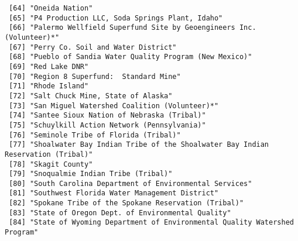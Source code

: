 \documentclass[
  12pt,
]{article}
\begin{document}
\begin{verbatim}
 [64] "Oneida Nation"                                                                                                        
 [65] "P4 Production LLC, Soda Springs Plant, Idaho"                                                                         
 [66] "Palermo Wellfield Superfund Site by Geoengineers Inc. (Volunteer)*"                                                   
 [67] "Perry Co. Soil and Water District"                                                                                    
 [68] "Pueblo of Sandia Water Quality Program (New Mexico)"                                                                  
 [69] "Red Lake DNR"                                                                                                         
 [70] "Region 8 Superfund:  Standard Mine"                                                                                   
 [71] "Rhode Island"                                                                                                         
 [72] "Salt Chuck Mine, State of Alaska"                                                                                     
 [73] "San Miguel Watershed Coalition (Volunteer)*"                                                                          
 [74] "Santee Sioux Nation of Nebraska (Tribal)"                                                                             
 [75] "Schuylkill Action Network (Pennsylvania)"                                                                             
 [76] "Seminole Tribe of Florida (Tribal)"                                                                                   
 [77] "Shoalwater Bay Indian Tribe of the Shoalwater Bay Indian Reservation (Tribal)"                                        
 [78] "Skagit County"                                                                                                        
 [79] "Snoqualmie Indian Tribe (Tribal)"                                                                                     
 [80] "South Carolina Department of Environmental Services"                                                                  
 [81] "Southwest Florida Water Management District"                                                                          
 [82] "Spokane Tribe of the Spokane Reservation (Tribal)"                                                                    
 [83] "State of Oregon Dept. of Environmental Quality"                                                                       
 [84] "State of Wyoming Department of Environmental Quality Watershed Program"                                               

\end{verbatim}
\end{document}
